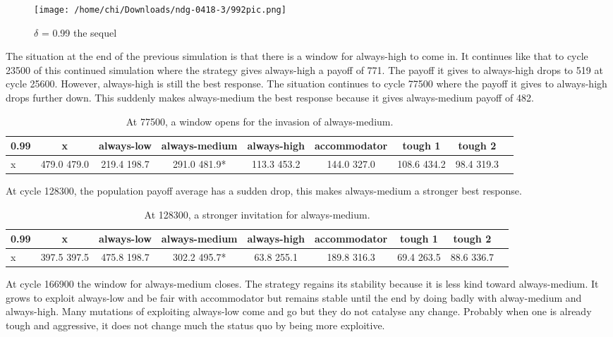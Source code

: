\documentclass[12.5pt]{report}
\begin{document}
\begin{figure}[h!]
\center
\texttt{[image: /home/chi/Downloads/ndg-0418-3/992pic.png]}
\caption{$\delta$ = 0.99 the sequel}
\end{figure}

The situation at the end of the previous simulation is that there is a window for always-high to come in. It continues like that to cycle 23500 of this continued simulation where the strategy gives always-high a payoff of 771. The payoff it gives to always-high drops to 519 at cycle 25600. However, always-high is still the best response. The situation continues to cycle 77500 where the payoff it gives to always-high drops further down. This suddenly makes always-medium the best response because it gives always-medium payoff of 482.


\begin{table}[h!]
\center
\begin{tabular}{l|cccccccc}
\textbf{0.99}& x & always-low & always-medium & always-high & accommodator &tough 1 & tough 2\\
\hline
x& 479.0 479.0 &   219.4 198.7   & 291.0 481.9*  & 113.3 453.2&    144.0 327.0  &  108.6 434.2 &   98.4 319.3 \\
\end{tabular}
\caption{At 77500, a window opens for the invasion of always-medium.}
\end{table}

At cycle 128300, the population payoff average has a sudden drop, this makes always-medium a stronger best response.
\begin{table}[h!]
\center
\begin{tabular}{l|cccccccc}
\textbf{0.99}& x & always-low & always-medium & always-high & accommodator &tough 1 & tough 2\\
\hline
x &397.5 397.5   & 475.8 198.7  &  302.2 495.7* &  63.8 255.1  &   189.8 316.3 &   69.4 263.5 &    88.6 336.7\\
\end{tabular}
\caption{At 128300, a stronger invitation for always-medium.}
\end{table}

At cycle 166900 the window for always-medium closes. The strategy regains its stability because it is less kind toward always-medium. It grows to exploit always-low and be fair with accommodator but remains stable until the end by doing badly with alway-medium and always-high. Many mutations of exploiting always-low come and go but they do not catalyse any change. Probably when one is already tough and aggressive, it does not change much the status quo by being more exploitive.
\end{document}
